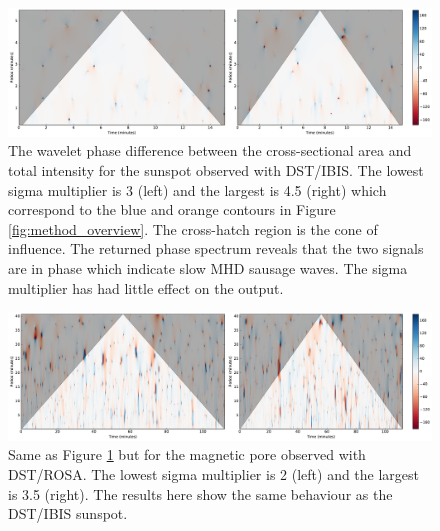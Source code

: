	\begin{figure}
    	\centering
    	\includegraphics[width=1\textwidth]{sunspot_phase.pdf}
    	\caption{
			            The wavelet phase difference between the cross-sectional area and total intensity for the sunspot observed with DST/IBIS.
			            The lowest sigma multiplier is 3 (left) and the largest is 4.5 (right) which correspond to the blue and orange contours in Figure \ref{fig:method_overview}.
			            The cross-hatch region is the cone of influence.
						The returned phase spectrum reveals that the two signals are in phase which indicate slow MHD sausage waves.
						The sigma multiplier has had little effect on the output.
    	             }
    	\label{fig:phase_sunspot}
    \end{figure}
 
    \begin{figure}
     	\centering
     	\includegraphics[width=1\textwidth]{pore_phase.pdf}
     	\caption{
	             		Same as Figure \ref{fig:phase_sunspot} but for the magnetic pore observed with DST/ROSA.
	             		The lowest sigma multiplier is 2 (left) and the largest is 3.5 (right).
	             		The results here show the same behaviour as the DST/IBIS sunspot.
     		          }
     	\label{fig:phase_pore}
    \end{figure}